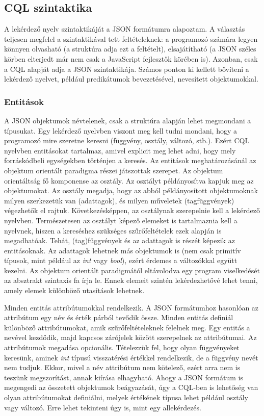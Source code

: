 \documentclass[a4paper,12pt]{report}
\begin{document}
\subsection{CQL szintaktika}
A lekérdező nyelv szintaktikáját a JSON formátumra alapoztam. A választás teljesen megfelel a szintaktikával tett feltételeknek: a programozó számára legyen könnyen olvasható (a struktúra adja ezt a feltételt), elsajátítható (a JSON széles körben elterjedt már nem csak a JavaScript fejlesztők körében is). Azonban, csak a CQL alapját adja a JSON szintaktikája. Számos ponton ki kellett bővíteni a lekérdező nyelvet, például predikátumok bevezetésével, nevesített objektumokkal.
\subsubsection{Entitások}
A JSON objektumok névtelenek, csak a struktúra alapján lehet megmondani a típusukat. Egy lekérdező nyelvben viszont meg kell tudni mondani, hogy a programozó mire szeretne keresni (függvény, osztály, változó, stb.). Ezért CQL nyelvben entitásokat tartalmaz, amivel explicit meg lehet adni, hogy mely forráskódbeli egységekben történjen a keresés. Az entitások meghatározásánál az objektum orientált paradigma részei játszottak szerepet. Az objektum orientáltság fő komponense az osztály. Az osztályt példányosítva kapjuk meg az objektumokat. Az osztály megadja, hogy az abból példányosított objektumoknak milyen szerkezetük van (adattagok), és milyen műveletek (tagfüggvények) végezhetők el rajtuk. Következésképpen, az osztálynak szerepelnie kell a lekérdező nyelvben. Természetesen az osztályt képező elemeket is tartalmaznia kell a nyelvnek, hiszen a kereséshez szükséges szűrőfeltételek ezek alapján is megadhatóak. Tehát, (tag)függvények és az adattagok is részét képezik az entitásoknak. Az adattagok lehetnek más objektumok is (nem csak primitív típusok, mint például az \textit{int} vagy \textit{bool}), ezért érdemes a változókkal együtt kezelni. Az objektum orientált paradigmától eltávolodva egy program viselkedését az absztrakt szintaxis fa írja le. Ennek elemeit szintén lekérdezhetővé lehet tenni, amely elemek különböző utasítások lehetnek.
\par Minden entitás attribútumokkal rendelkezik. A JSON formátumhoz hasonlóan az attribútum egy név és érték párból tevődik össze. Minden entitás definiál különböző attribútumokat, amik szűrőfeltételeknek felelnek meg. Egy entitás a nevével kezdődik, majd kapcsos zárójelek között szerepelnek az attribútumai. Az attribútumok megadása opcionális. Tételezzük fel, hogy olyan függvényeket keresünk, aminek \textit{int} típusú visszatérési értékkel rendelkezik, de a függvény nevét nem tudjuk. Ekkor, mivel a név attribútum nem kötelező, ezért arra nem is teszünk megszorítást, annak kiírása elhagyható. Ahogy a JSON formátum is megengedi az összetett objektumok beágyazását, úgy a CQL-ben is lehetőség van olyan attribútumokat definiálni, melyek értékének típusa lehet például osztály vagy változó. Erre lehet tekinteni úgy is, mint egy allekérdezés. 
\end{document}
